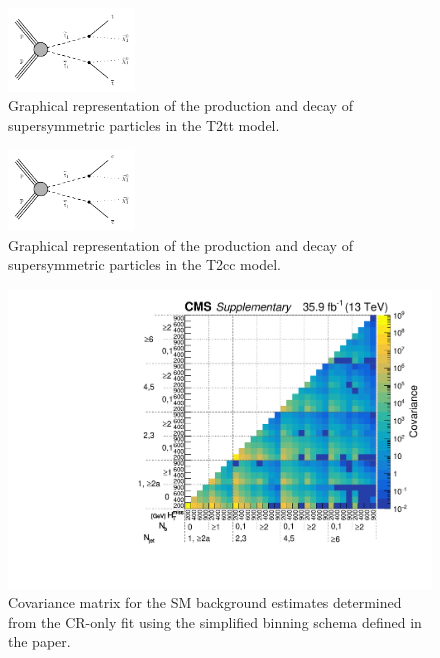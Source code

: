 \begin{figure}[h!] \begin{center}
    \includegraphics[width=0.3\textwidth]{Supplementary/T2tt_feyn_aux}
        \caption{
            Graphical representation of the production and decay of
            supersymmetric particles in the T2tt model.
        }
        \label{fig:simplified-models-feyn-3rdGen}
\end{center} \end{figure}

\begin{figure}[h!] \begin{center}
    \includegraphics[width=0.3\textwidth]{Supplementary/T2cc_feyn_aux}
        \caption{
            Graphical representation of the production and decay of
            supersymmetric particles in the T2cc model.
        }
        \label{fig:simplified-models-feyn-3rdGen}
\end{center} \end{figure}

\clearpage
\begin{figure}
  \centering
  \includegraphics[width=\textwidth]{Supplementary/SimplifiedBinning_Covariance_aux}
  \caption{Covariance matrix for the SM background estimates
    determined from the CR-only fit using the simplified binning
	schema defined in the paper.} %
  \label{fig:covariance_aux}
\end{figure} 
\clearpage

